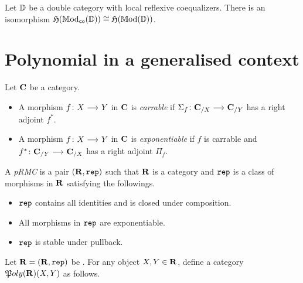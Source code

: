 \documentclass[a4paper,dvipsnames, 11pt]{amsart} %
\begin{document}
\begin{lemma}
	Let $\mathbb{D}$ be a double category with local reflexive coequalizers.
	There is an isomorphism ${\mathfrak{H}}(\mathbb{M}\mathrm{od}_{\mathtt{co}}(\mathbb{D}))\cong{\mathfrak{H}}(\mathbb{M}\mathrm{od}(\mathbb{D}))$.
\end{lemma}
\begin{definition}
\end{definition}
\section{Polynomial in a generalised context}
\begin{definition}
	Let $\mathbf{C}$ be a category.
	\begin{itemize}
		\item %
			A morphism $f\colon X\arr Y$ in $\mathbf{C}$ is \emph{carrable} if
			$\Sigma_f\colon\one{C}_{/X}\arr\one{C}_{/Y}$ has a right adjoint $f^*$.
		\item %
			A morphism $f\colon X\arr Y$ in $\mathbf{C}$ is \emph{exponentiable} if $f$
			is carrable and $f^*\colon\one{C}_{/Y}\arr\one{C}_{/X}$ has a right adjoint $\Pi_f$.
		\qedhere %
	\end{itemize}
\end{definition}
\begin{definition}
	A \emph{\ac{pRMC}} is a pair $(\mathbf{R},\mathtt{rep})$
	such that $\mathbf{R}$ is a category
	and $\mathtt{rep}$ is a class of morphisms in $\mathbf{R}$ satisfying the followings.
	\begin{itemize}
		\item %
			$\mathtt{rep}$ contains all identities and is closed under composition.
		\item %
			All morphisms in $\mathtt{rep}$ are exponentiable.
		\item %
			$\mathtt{rep}$ is stable under pullback.
		\qedhere %
	\end{itemize}
\end{definition}
\begin{definition}
	Let $\mathbf{R}=(\mathbf{R},\mathtt{rep})$ be .
	For any object $X,Y\in\mathbf{R}$,
	define a category ${\mathfrak{P}}{oly}(\mathbf{R})(X,Y)$ as follows.
\end{definition}



\end{document}
